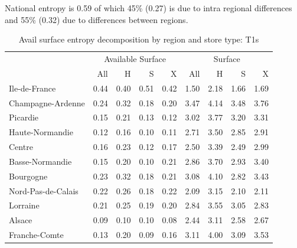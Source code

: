 \documentclass[11pt]{article}
\begin{document}
National entropy is 0.59 of which 45\% (0.27) is due to intra regional differences and 55\% (0.32) due to differences between regions.

\begin{table}[H]
\caption{Avail surface entropy decomposition by region and store type: T1s}
\footnotesize

\begin{tabular}{l|rrrr|rrrr}
\toprule
\toprule
{} & \multicolumn{4}{c|}{Available Surface} & \multicolumn{4}{c}{Surface} \\
{} &  All &  H &  S &  X &     All &     H &     S &     X \\
\midrule
Ile-de-France              &        0.44 &          0.40 &          0.51 &          0.42 &       1.50 &       2.18 &       1.66 &       1.69 \\
Champagne-Ardenne          &        0.24 &          0.32 &          0.18 &          0.20 &       3.47 &       4.14 &       3.48 &       3.76 \\
Picardie                   &        0.15 &          0.21 &          0.13 &          0.12 &       3.02 &       3.77 &       3.20 &       3.31 \\
Haute-Normandie            &        0.12 &          0.16 &          0.10 &          0.11 &       2.71 &       3.50 &       2.85 &       2.91 \\
Centre                     &        0.16 &          0.23 &          0.12 &          0.17 &       2.50 &       3.39 &       2.49 &       2.99 \\
Basse-Normandie            &        0.15 &          0.20 &          0.10 &          0.21 &       2.86 &       3.70 &       2.93 &       3.40 \\
Bourgogne                  &        0.23 &          0.32 &          0.18 &          0.21 &       3.08 &       4.10 &       2.82 &       3.43 \\
Nord-Pas-de-Calais         &        0.22 &          0.26 &          0.18 &          0.22 &       2.09 &       3.15 &       2.10 &       2.11 \\
Lorraine                   &        0.21 &          0.25 &          0.19 &          0.20 &       2.84 &       3.55 &       3.05 &       2.83 \\
Alsace                     &        0.09 &          0.10 &          0.10 &          0.08 &       2.44 &       3.11 &       2.58 &       2.67 \\
Franche-Comte              &        0.13 &          0.20 &          0.09 &          0.16 &       3.11 &       4.00 &       3.09 &       3.53 \\

\end{tabular}
\end{table}
\end{document}
